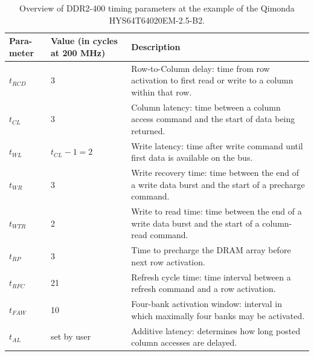 \begin{table}
\caption{Overview of DDR2-400 timing parameters at the example of the Qimonda HYS64T64020EM-2.5-B2.}\label{table:ddr2-constraints}
\begin{center}
\small
\begin{tabular}{p{0.8cm}p{2.0cm}p{13.28cm}}
Para-meter	& Value (in cycles at 200 MHz)	& Description \\\hline
$t_{RCD}$			& 3						& Row-to-Column delay: time from row activation to first read or write to a column within that row.\\
$t_{CL}$			& 3						& Column latency: time between a column access command and the start of data being returned.\\
$t_{WL}$			& $t_{CL}-1=2$			& Write latency: time after write command until first data is available on the bus.\\
$t_{WR}$			& 3						& Write recovery time: time between the end of a write data burst and the start of a precharge command.\\
$t_{WTR}$ 			& 2 					& Write to read time: time between the end of a write data burst and the start of a column-read command.\\%
$t_{RP}$			& 3						& Time to precharge the DRAM array before next row activation.  \\
$t_{RFC}$			& 21					& Refresh cycle time: time interval between a refresh command and a row activation.\\
$t_{FAW}$			& 10					& Four-bank activation window: interval in which maximally four banks may be activated.\\
$t_{AL}$			& set by user			& Additive latency: determines how long posted column accesses are delayed.
\end{tabular}
\vspace{-7.5mm}
\end{center}
\end{table}

